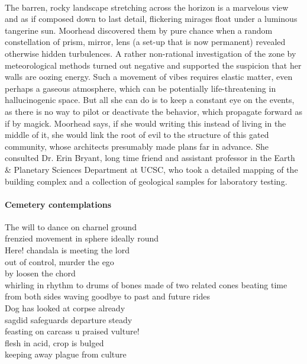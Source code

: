 \documentclass{article}
\begin{document}
\paragraph{}
The barren, rocky landscape stretching across the horizon
is a marvelous view and as if composed down to last detail,
flickering mirages float under a luminous tangerine sun.
Moorhead discovered them by pure chance 
when a random constellation of prism, mirror, lens
(a set-up that is now permanent) revealed 
otherwise hidden turbulences.
A rather non-rational investigation of the zone 
by meteorological methods turned out negative 
and supported the suspicion
that her walls are oozing energy.
Such a movement of vibes requires elastic matter,
even perhaps a gaseous atmosphere, which can be potentially 
life-threatening in hallucinogenic space.
But all she can do is to keep a constant eye on the events, 
as there is no way to pilot or deactivate the behavior,
which propagate forward as if by magick. 
Moorhead says, if she would writing this instead of 
living in the middle of it,
she would link the root of evil to the structure of this gated community, whose architects presumably made plans far in advance.
She consulted Dr. Erin Bryant, long time friend and assistant professor
in the Earth \& Planetary Sciences Department at UCSC, 
who took a detailed mapping of the building complex
and a collection of geological samples for laboratory testing. 

\paragraph{Cemetery contemplations}
The will to dance on charnel ground \\
frenzied movement in sphere ideally round \\
Here! chandala is meeting the lord \\
out of control, murder the ego \\ 
by loosen the chord \\

whirling in rhythm to drums of bones 
made of two related cones
beating time from both sides 
waving goodbye to past and future rides \\

Dog has looked at corpse already \\
sagdid safeguards departure steady \\ 
feasting on carcass u praised vulture! \\
flesh in acid, crop is bulged \\
keeping away plague from culture \\
\end{document}
